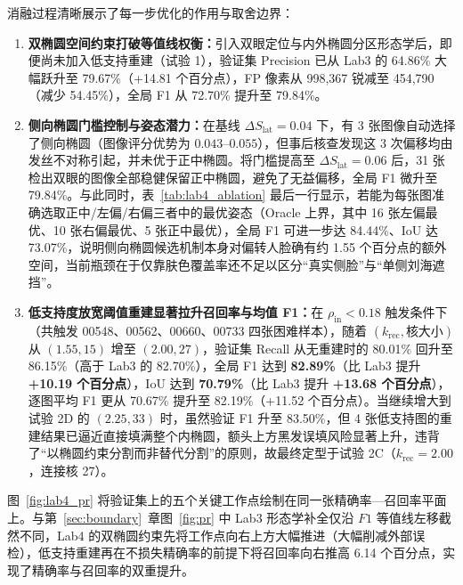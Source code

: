消融过程清晰展示了每一步优化的作用与取舍边界：
\begin{enumerate}
\item \textbf{双椭圆空间约束打破等值线权衡：}引入双眼定位与内外椭圆分区形态学后，即便尚未加入低支持重建（试验 1），验证集 Precision 已从 Lab3 的 64.86\% 大幅跃升至 79.67\%（+14.81 个百分点），FP 像素从 998,367 锐减至 454,790（减少 54.45\%），全局 F1 从 72.70\% 提升至 79.84\%。
\item \textbf{侧向椭圆门槛控制与姿态潜力：}在基线 $\Delta S_{\text{lat}}=0.04$ 下，有 3 张图像自动选择了侧向椭圆（图像评分优势为 $0.043\text{--}0.055$），但事后核查发现这 3 次偏移均由发丝不对称引起，并未优于正中椭圆。将门槛提高至 $\Delta S_{\text{lat}}=0.06$ 后，31 张检出双眼的图像全部稳健保留正中椭圆，避免了无益偏移，全局 F1 微升至 79.84\%。与此同时，表~\ref{tab:lab4_ablation} 最后一行显示，若能为每张图准确选取正中/左偏/右偏三者中的最优姿态（Oracle 上界，其中 16 张左偏最优、10 张右偏最优、5 张正中最优），全局 F1 可进一步达 84.44\%、IoU 达 73.07\%，说明侧向椭圆候选机制本身对偏转人脸确有约 1.55 个百分点的额外空间，当前瓶颈在于仅靠肤色覆盖率还不足以区分“真实侧脸”与“单侧刘海遮挡”。
\item \textbf{低支持度放宽阈值重建显著拉升召回率与均值 F1：}在 $\rho_{\text{in}}<0.18$ 触发条件下（共触发 00548、00562、00660、00733 四张困难样本），随着 $(k_{\text{rec}}, \text{核大小})$ 从 $(1.55, 15)$ 增至 $(2.00, 27)$，验证集 Recall 从无重建时的 80.01\% 回升至 86.15\%（高于 Lab3 的 82.70\%），全局 F1 达到 \textbf{82.89\%}（比 Lab3 提升 \textbf{+10.19 个百分点}），IoU 达到 \textbf{70.79\%}（比 Lab3 提升 \textbf{+13.68 个百分点}），逐图平均 F1 更从 70.67\% 提升至 82.19\%（+11.52 个百分点）。当继续增大到试验 2D 的 $(2.25, 33)$ 时，虽然验证 F1 升至 83.50\%，但 4 张低支持图的重建结果已逼近直接填满整个内椭圆，额头上方黑发误填风险显著上升，违背了“以椭圆约束分割而非替代分割”的原则，故最终定型于试验 2C（$k_{\text{rec}}=2.00$，连接核 27）。
\end{enumerate}

图~\ref{fig:lab4_pr} 将验证集上的五个关键工作点绘制在同一张精确率—召回率平面上。与第~\ref{sec:boundary}~章图~\ref{fig:pr} 中 Lab3 形态学补全仅沿 $F1$ 等值线左移截然不同，Lab4 的双椭圆约束先将工作点向右上方大幅推进（大幅削减外部误检），低支持重建再在不损失精确率的前提下将召回率向右推高 6.14 个百分点，实现了精确率与召回率的双重提升。

